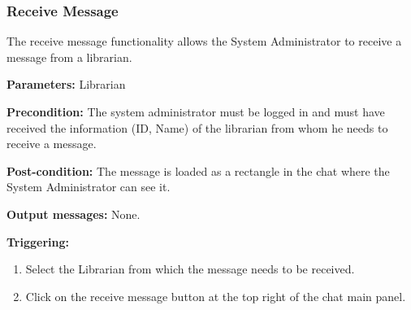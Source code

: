 \documentclass{article}
\begin{document}
\subsubsection{Receive Message}

The receive message functionality allows the System
Administrator to receive a message from a librarian.

\begin{description}

\item \textbf{Parameters:} Librarian

\item \textbf{Precondition:} The system administrator must be logged in and must
have received the information (ID, Name) of the librarian from whom he needs to
receive a message.

\item \textbf{Post-condition:} The message is loaded as a rectangle in the chat
where the System Administrator can see it.

\item \textbf{Output messages:} None.

\item \textbf{Triggering:}
\begin{enumerate}

\item Select the Librarian from which the message needs to be received. 

\item Click on the receive message button at the top right of the chat
main panel.
  

\end{enumerate}

\end{description}
\end{document}
